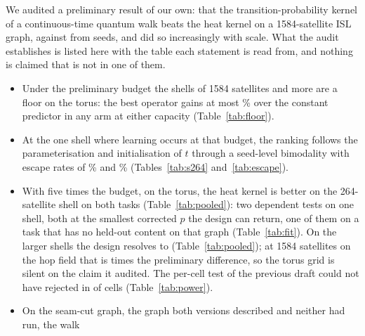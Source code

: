 \documentclass[preprint,11pt,3p]{elsarticle}
\begin{document}
We audited a preliminary result of our own: that the transition-probability kernel of a
continuous-time quantum walk beats the heat kernel on a 1584-satellite ISL graph,
\numPrelimWalkMAE{} against \numPrelimHeatMAE{} from \numPrelimSeeds{} seeds, and did so
increasingly with scale. What the audit establishes is listed here with the table each statement
is read from, and nothing is claimed that is not in one of them.
\begin{itemize}
\item Under the preliminary budget the shells of 1584 satellites and more are a floor on the
  torus: the best operator gains at most \numGainLargeMax\% over the constant predictor in any
  arm at either capacity (Table~\ref{tab:floor}).
\item At the one shell where learning occurs at that budget, the ranking follows the
  parameterisation and initialisation of $t$ through a seed-level bimodality with escape rates of
  \numEscapeHeatPct\% and \numEscapeWalkPct\% (Tables~\ref{tab:s264} and~\ref{tab:escape}).
\item With five times the budget, on the torus, the heat kernel is better on the 264-satellite
  shell on both tasks (Table~\ref{tab:pooled}): two dependent tests on one shell, both at the
  smallest corrected $p$ the design can return, one of them on a task that has no held-out
  content on that graph (Table~\ref{tab:fit}). On the larger shells the design resolves
  \numPooledMdeLargeMin{} to \numPooledMdeMax{} (Table~\ref{tab:pooled}); at 1584 satellites on
  the hop field that is \numMdeRatioHopsShellOne{} times the preliminary difference, so the
  torus grid is silent on the claim it audited. The per-cell test of the previous draft could not
  have rejected in \numPowerCannotReject{} of \numGthreeArmCells{} cells (Table~\ref{tab:power}).
\item On the seam-cut graph, the graph both versions described and neither had run, the walk

\end{itemize}
\end{document}
